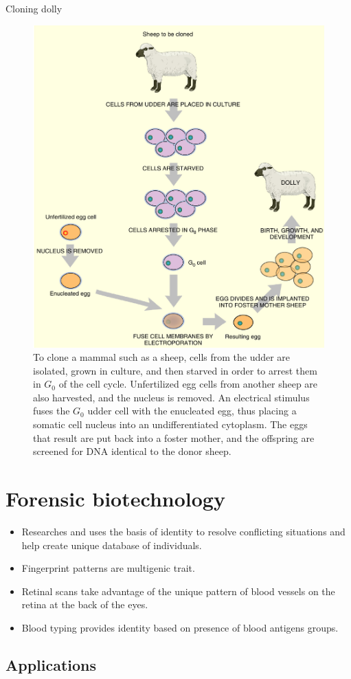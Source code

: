 \documentclass[ignorenonframetext,aspectratio=169]{beamer}
\providecommand{\tightlist}{%
  \setlength{\itemsep}{0pt}\setlength{\parskip}{0pt}}
\begin{document}
\begin{frame}{Cloning dolly}
\protect\hypertarget{cloning-dolly}{}

\begin{figure}
\includegraphics[width=0.38\linewidth]{../images/dolly_cloning} \caption{To clone a mammal such as a sheep, cells from the udder are isolated, grown in culture, and then starved in order to arrest them in $G_0$ of the cell cycle. Unfertilized egg cells from another sheep are also harvested, and the nucleus is removed. An electrical stimulus fuses the $G_0$ udder cell with the enucleated egg, thus placing a somatic cell nucleus into an undifferentiated cytoplasm. The eggs that result are put back into a foster mother, and the offspring are screened for DNA identical to the donor sheep.}\label{fig:dolly-sheep-cloning}
\end{figure}

\end{frame}

\hypertarget{forensic-biotechnology}{%
\section{Forensic biotechnology}\label{forensic-biotechnology}}

\begin{itemize}
\tightlist
\item
  Researches and uses the basis of identity to resolve conflicting
  situations and help create unique database of individuals.
\item
  Fingerprint patterns are multigenic trait.
\item
  Retinal scans take advantage of the unique pattern of blood vessels on
  the retina at the back of the eyes.
\item
  Blood typing provides identity based on presence of blood antigens
  groups.
\end{itemize}

\hypertarget{applications-2}{%
\subsection{Applications}\label{applications-2}}
\end{document}

